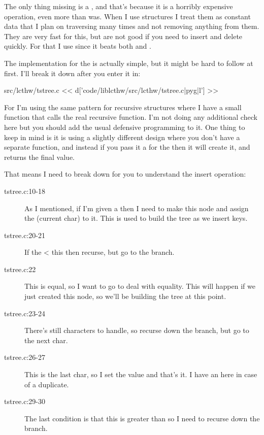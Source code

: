 The only thing missing is a , and that's because 
it is a horribly expensive operation, even more than 
was.  When I use  structures I treat them as constant data
that I plan on traversing many times and not removing anything from them.
They are very fast for this, but are not good if you need to insert and
delete quickly.  For that I use  since it beats both
 and .

The implementation for the  is actually simple, but it might
be hard to follow at first.  I'll break it down after you enter it in:

\begin{code}{src/lcthw/tstree.c}
<< d['code/liblcthw/src/lcthw/tstree.c|pyg|l'] >>
\end{code}

For  I'm using the same pattern for recursive structures
where I have a small function that calls the real recursive function.  I'm not
doing any additional check here but you should add the usual defensive programming
to it.  One thing to keep in mind is it is using a slightly different
design where you don't have a separate  function, and
instead if you pass it a  for the  then it will create
it, and returns the final value.

That means I need to break down  for you
to understand the insert operation:

\begin{description}
\item[tstree.c:10-18] As I mentioned, if I'm given a  then I need to make
    this node and assign the  (current char) to it. This is used
    to build the tree as we insert keys.
\item[tstree.c:20-21] If the  < this then recurse, but go to the 
    branch.
\item[tstree.c:22] This  is equal, so I want to go to deal with equality.
    This will happen if we just created this node, so we'll be building the
    tree at this point.
\item[tstree.c:23-24] There's still characters to handle, so recurse down the 
    branch, but go to the next  char.
\item[tstree.c:26-27] This is the last char, so I set the value and that's it.  I have
    an  here in case of a duplicate.
\item[tstree.c:29-30] The last condition is that this  is greater than 
     so I need to recurse down the  branch.
\end{description}

